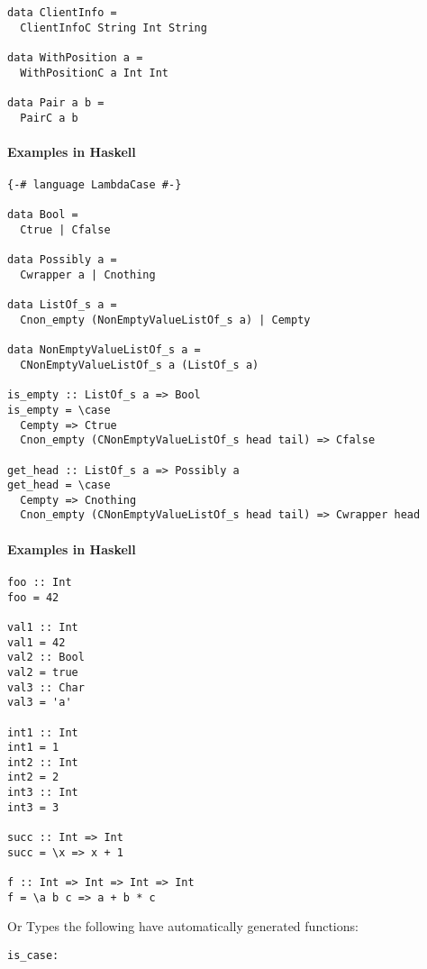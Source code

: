 \documentclass{article}
\def\H{Haskell}
\begin{document}
\begin{verbatim}
data ClientInfo =
  ClientInfoC String Int String

data WithPosition a = 
  WithPositionC a Int Int

data Pair a b = 
  PairC a b
\end{verbatim}

\paragraph{Examples in \H}

\begin{verbatim}
{-# language LambdaCase #-}

data Bool =
  Ctrue | Cfalse

data Possibly a =
  Cwrapper a | Cnothing

data ListOf_s a =
  Cnon_empty (NonEmptyValueListOf_s a) | Cempty

data NonEmptyValueListOf_s a =
  CNonEmptyValueListOf_s a (ListOf_s a)

is_empty :: ListOf_s a => Bool
is_empty = \case
  Cempty => Ctrue
  Cnon_empty (CNonEmptyValueListOf_s head tail) => Cfalse

get_head :: ListOf_s a => Possibly a
get_head = \case
  Cempty => Cnothing
  Cnon_empty (CNonEmptyValueListOf_s head tail) => Cwrapper head
\end{verbatim}

\paragraph{Examples in \H}
\begin{verbatim}
foo :: Int
foo = 42

val1 :: Int
val1 = 42
val2 :: Bool
val2 = true
val3 :: Char
val3 = 'a'

int1 :: Int
int1 = 1
int2 :: Int
int2 = 2
int3 :: Int
int3 = 3

succ :: Int => Int
succ = \x => x + 1

f :: Int => Int => Int => Int
f = \a b c => a + b * c
\end{verbatim}

Or Types the following have automatically generated functions:

\begin{verbatim}
is_case:
\end{verbatim}

%
\end{document}
